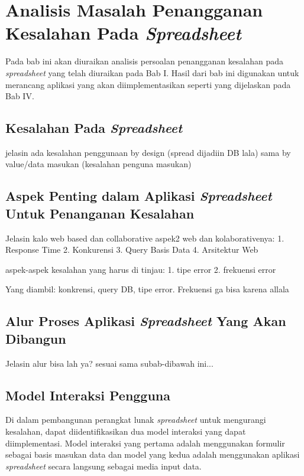 \chapter{Analisis Masalah Penangganan Kesalahan Pada \textit{Spreadsheet}}

Pada bab ini akan diuraikan analisis persoalan penangganan kesalahan pada \textit{spreadsheet} yang telah diuraikan pada Bab I. Hasil dari bab ini digunakan untuk merancang aplikasi yang akan diimplementasikan seperti yang dijelaskan pada Bab IV.

\section{Kesalahan Pada \textit{Spreadsheet}}
jelasin ada kesalahan penggunaan by design (spread dijadiin DB lala) sama by value/data masukan (kesalahan penguna masukan)

\section{Aspek Penting dalam Aplikasi \textit{Spreadsheet} Untuk Penanganan Kesalahan}
Jelasin kalo web based dan collaborative
aspek2 web dan kolaborativenya:
1. Response Time
2. Konkurensi
3. Query Basis Data
4. Arsitektur Web

aspek-aspek kesalahan yang harus di tinjau: \parencite{Powell2009}
1. tipe error
2. frekuensi error

Yang diambil: konkrensi, query DB, tipe error. Frekuensi ga bisa karena allala

\section{Alur Proses Aplikasi \textit{Spreadsheet} Yang Akan Dibangun}
Jelasin alur bisa lah ya? sesuai sama subab-dibawah ini...

\section{Model Interaksi Pengguna}
Di dalam pembangunan perangkat lunak \textit{spreadsheet} untuk mengurangi kesalahan, dapat diidentifikasikan dua model interaksi yang dapat diimplementasi. Model interaksi yang pertama adalah menggunakan formulir sebagai basis masukan data dan model yang kedua adalah menggunakan aplikasi \textit{spreadsheet} secara langsung sebagai media input data.

